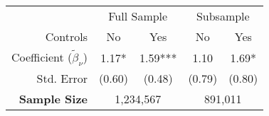 \documentclass{standalone}
\begin{document}
\begin{tabular}{rcccc}
\toprule 
\midrule 
 & \multicolumn{2}{c}{Full Sample} & \multicolumn{2}{c}{Subsample} \\[5pt]
 \cmidrule(lr){2-3} \cmidrule(lr){4-5} 
Controls & No & Yes & No & Yes \\
\midrule 
Coefficient ($\tilde{\beta}_\nu$) & 1.17* & 1.59*** & 1.10 & 1.69* \\
Std. Error & {\color{blue} (0.60)} & {\color{blue} (0.48)} & {\color{blue} (0.79)} & {\color{blue} (0.80)} \\
\midrule 
\textbf{ Sample Size} & \multicolumn{2}{c}{1,234,567} & \multicolumn{2}{c}{891,011} \\
\midrule 
\bottomrule 
\end{tabular}
\end{document}
